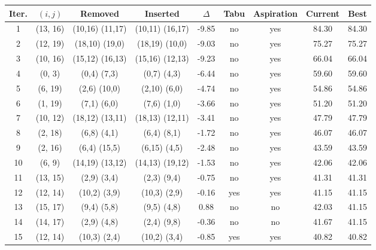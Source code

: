 \begin{tabular}{ccccccccc}
\toprule
Iter. & $(i, j)$ & Removed & Inserted & $\Delta$ & Tabu & Aspiration & Current & Best \\
\midrule
1 & (13, 16) & (10,16) (11,17) & (10,11) (16,17) & -9.85 & no & yes & 84.30 & 84.30 \\
2 & (12, 19) & (18,10) (19,0) & (18,19) (10,0) & -9.03 & no & yes & 75.27 & 75.27 \\
3 & (10, 16) & (15,12) (16,13) & (15,16) (12,13) & -9.23 & no & yes & 66.04 & 66.04 \\
4 & (0, 3) & (0,4) (7,3) & (0,7) (4,3) & -6.44 & no & yes & 59.60 & 59.60 \\
5 & (6, 19) & (2,6) (10,0) & (2,10) (6,0) & -4.74 & no & yes & 54.86 & 54.86 \\
6 & (1, 19) & (7,1) (6,0) & (7,6) (1,0) & -3.66 & no & yes & 51.20 & 51.20 \\
7 & (10, 12) & (18,12) (13,11) & (18,13) (12,11) & -3.41 & no & yes & 47.79 & 47.79 \\
8 & (2, 18) & (6,8) (4,1) & (6,4) (8,1) & -1.72 & no & yes & 46.07 & 46.07 \\
9 & (2, 16) & (6,4) (15,5) & (6,15) (4,5) & -2.48 & no & yes & 43.59 & 43.59 \\
10 & (6, 9) & (14,19) (13,12) & (14,13) (19,12) & -1.53 & no & yes & 42.06 & 42.06 \\
11 & (13, 15) & (2,9) (3,4) & (2,3) (9,4) & -0.75 & no & yes & 41.31 & 41.31 \\
12 & (12, 14) & (10,2) (3,9) & (10,3) (2,9) & -0.16 & yes & yes & 41.15 & 41.15 \\
13 & (15, 17) & (9,4) (5,8) & (9,5) (4,8) & 0.88 & no & no & 42.03 & 41.15 \\
14 & (14, 17) & (2,9) (4,8) & (2,4) (9,8) & -0.36 & no & no & 41.67 & 41.15 \\
15 & (12, 14) & (10,3) (2,4) & (10,2) (3,4) & -0.85 & yes & yes & 40.82 & 40.82 \\
\bottomrule
\end{tabular}
